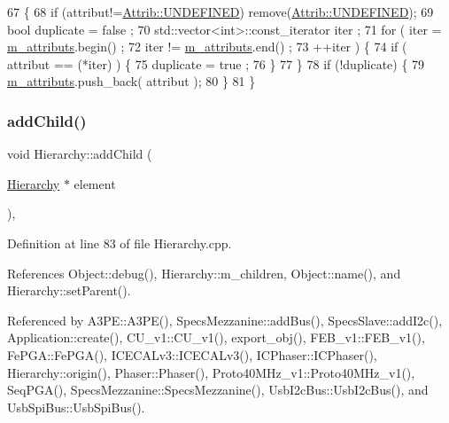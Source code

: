 \begin{DoxyCode}
67                             \{
68     \textcolor{keywordflow}{if} (attribut!=\hyperlink{classAttrib_a69e171d7cc6417835a5a306d3c764235a3a8da2ab97dda18aebab196fe4100531}{Attrib::UNDEFINED}) \textcolor{keyword}{remove}(\hyperlink{classAttrib_a69e171d7cc6417835a5a306d3c764235a3a8da2ab97dda18aebab196fe4100531}{Attrib::UNDEFINED});
69     \textcolor{keywordtype}{bool} duplicate = false ;
70     std::vector<int>::const\_iterator iter ;
71     \textcolor{keywordflow}{for} ( iter  = \hyperlink{classAttrib_ac4bd58a0cc6b38a3b711d609a3d3aacc}{m\_attributs}.begin() ;
72           iter != \hyperlink{classAttrib_ac4bd58a0cc6b38a3b711d609a3d3aacc}{m\_attributs}.end()   ;
73           ++iter ) \{
74       \textcolor{keywordflow}{if} ( attribut == (*iter) ) \{
75         duplicate = true ;
76       \}
77     \}
78     \textcolor{keywordflow}{if} (!duplicate) \{
79       \hyperlink{classAttrib_ac4bd58a0cc6b38a3b711d609a3d3aacc}{m\_attributs}.push\_back( attribut );
80     \}
81   \}
\end{DoxyCode}
\mbox{\label{classHierarchy_ad677774ff38fcb257c04a3a10d471fac}} 
\subsubsection{\texorpdfstring{add\+Child()}{addChild()}}
{\footnotesize\ttfamily void Hierarchy\+::add\+Child (\begin{DoxyParamCaption}\item[{\hyperlink{classHierarchy}{Hierarchy} $\ast$}]{element }\end{DoxyParamCaption})\hspace{0.3cm}{\ttfamily [virtual]}, {\ttfamily [inherited]}}



Definition at line 83 of file Hierarchy.\+cpp.



References Object\+::debug(), Hierarchy\+::m\+\_\+children, Object\+::name(), and Hierarchy\+::set\+Parent().



Referenced by A3\+P\+E\+::\+A3\+P\+E(), Specs\+Mezzanine\+::add\+Bus(), Specs\+Slave\+::add\+I2c(), Application\+::create(), C\+U\+\_\+v1\+::\+C\+U\+\_\+v1(), export\+\_\+obj(), F\+E\+B\+\_\+v1\+::\+F\+E\+B\+\_\+v1(), Fe\+P\+G\+A\+::\+Fe\+P\+G\+A(), I\+C\+E\+C\+A\+Lv3\+::\+I\+C\+E\+C\+A\+Lv3(), I\+C\+Phaser\+::\+I\+C\+Phaser(), Hierarchy\+::origin(), Phaser\+::\+Phaser(), Proto40\+M\+Hz\+\_\+v1\+::\+Proto40\+M\+Hz\+\_\+v1(), Seq\+P\+G\+A(), Specs\+Mezzanine\+::\+Specs\+Mezzanine(), Usb\+I2c\+Bus\+::\+Usb\+I2c\+Bus(), and Usb\+Spi\+Bus\+::\+Usb\+Spi\+Bus().


